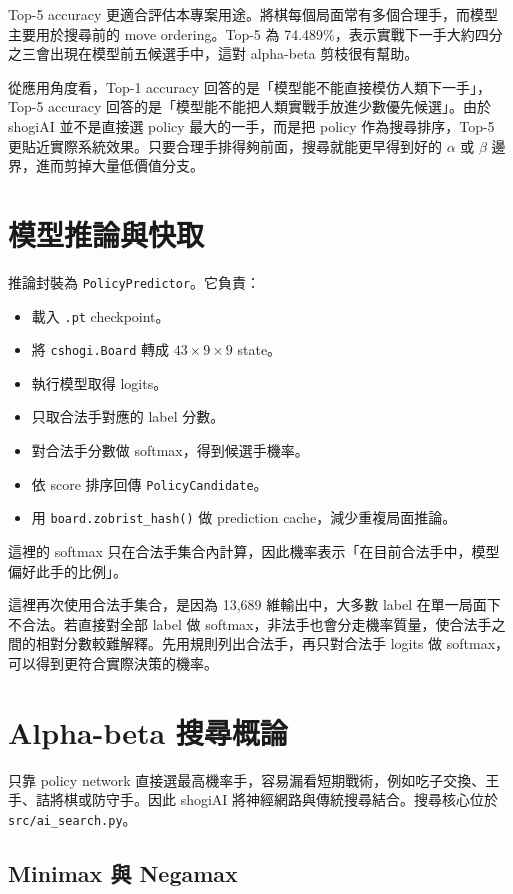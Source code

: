 \documentclass[12pt,a4paper,fontset=none]{ctexart}
\begin{document}
Top-5 accuracy 更適合評估本專案用途。將棋每個局面常有多個合理手，而模型主要用於搜尋前的 move ordering。Top-5 為 74.489\%，表示實戰下一手大約四分之三會出現在模型前五候選手中，這對 alpha-beta 剪枝很有幫助。

從應用角度看，Top-1 accuracy 回答的是「模型能不能直接模仿人類下一手」，Top-5 accuracy 回答的是「模型能不能把人類實戰手放進少數優先候選」。由於 shogiAI 並不是直接選 policy 最大的一手，而是把 policy 作為搜尋排序，Top-5 更貼近實際系統效果。只要合理手排得夠前面，搜尋就能更早得到好的 $\alpha$ 或 $\beta$ 邊界，進而剪掉大量低價值分支。

\section{模型推論與快取}

推論封裝為 \texttt{PolicyPredictor}。它負責：

\begin{itemize}
  \item 載入 \texttt{.pt} checkpoint。
  \item 將 \texttt{cshogi.Board} 轉成 $43 \times 9 \times 9$ state。
  \item 執行模型取得 logits。
  \item 只取合法手對應的 label 分數。
  \item 對合法手分數做 softmax，得到候選手機率。
  \item 依 score 排序回傳 \texttt{PolicyCandidate}。
  \item 用 \texttt{board.zobrist\_hash()} 做 prediction cache，減少重複局面推論。
\end{itemize}

這裡的 softmax 只在合法手集合內計算，因此機率表示「在目前合法手中，模型偏好此手的比例」。

這裡再次使用合法手集合，是因為 13,689 維輸出中，大多數 label 在單一局面下不合法。若直接對全部 label 做 softmax，非法手也會分走機率質量，使合法手之間的相對分數較難解釋。先用規則列出合法手，再只對合法手 logits 做 softmax，可以得到更符合實際決策的機率。

\section{Alpha-beta 搜尋概論}

只靠 policy network 直接選最高機率手，容易漏看短期戰術，例如吃子交換、王手、詰將棋或防守手。因此 shogiAI 將神經網路與傳統搜尋結合。搜尋核心位於 \texttt{src/ai\_search.py}。

\subsection{Minimax 與 Negamax}
\end{document}
